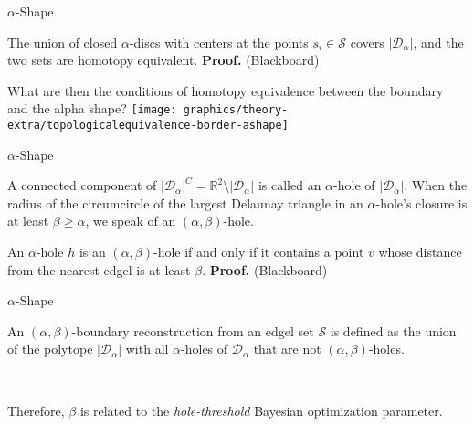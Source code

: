     \begin{frame}{$\alpha$-Shape}
         {
            \begin{lemma}
                The union of closed $\alpha$-discs with centers at the points $s_i \in \mathcal{S}$ covers $\lvert \mathcal{D}_\alpha \rvert$, and the two sets are homotopy equivalent.\newline
                \textbf{Proof.} (Blackboard)
            \end{lemma}
        }
         {
            What are then the conditions of homotopy equivalence between the boundary and the alpha shape?
        }
         {
            \texttt{[image: graphics/theory-extra/topologicalequivalence-border-ashape]}
        }
    \end{frame}

    \begin{frame}{$\alpha$-Shape}
         {
            \begin{definition}
                A connected component of $\lvert\mathcal{D}_\alpha\rvert^C = \mathbb{R}^2 \setminus \lvert \mathcal{D}_\alpha \rvert$ is called an $\alpha$-hole of $\lvert\mathcal{D}_\alpha\rvert$. When the radius of the circumcircle of the largest Delaunay triangle in an $\alpha$-hole’s closure is at least $\beta \geq \alpha$, we speak of an $\left(\alpha, \beta\right)$-hole.
            \end{definition}
        }
         {
            \begin{lemma}
                An $\alpha$-hole $h$ is an $\left(\alpha,\beta\right)$-hole if and only if it contains a point $v$ whose distance from the nearest edgel is at least $\beta$.\newline
                \textbf{Proof.} (Blackboard)
            \end{lemma}
        }
    \end{frame}

    \begin{frame}{$\alpha$-Shape}
         {
            \begin{definition}
                An $\left(\alpha,\beta\right)$-boundary reconstruction from an edgel set $\mathcal{S}$ is defined as the union of the polytope $\lvert\mathcal{D}_\alpha\rvert$ with all $\alpha$-holes of $\mathcal{D}_\alpha$ that are not $\left(\alpha,\beta\right)$-holes.
            \end{definition}
        }
         {
            \begin{remark}
                Therefore, $\beta$ is related to the \textit{hole-threshold} Bayesian optimization parameter.
            \end{remark}
        }
    \end{frame}

